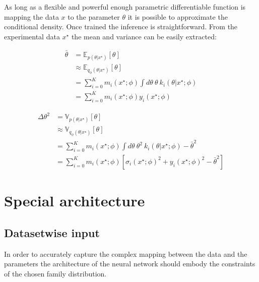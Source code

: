 As long as a flexible and powerful enough parametric differentiable function is mapping the data $x$ to the parameter $\theta$ it is possible to approximate the conditional density.
Once trained the inference is straightforward.
From the experimental data $x^\star$ the mean and variance can be easily extracted:

\begin{align}
    \bar \theta & = \mathbb E_{p(\theta | x^\star)}[\theta] \\
    & \approx \mathbb E_{q_\phi(\theta | x^\star)}[\theta] \\
    & = \sum_{i=0}^K m_i(x^\star ; \phi) \int d\theta ~ \theta ~ k_i(\theta | x^\star ; \phi) \\
    & = \sum_{i=0}^K m_i(x^\star ; \phi) y_i(x^\star ; \phi)
\end{align}

\begin{align}
    \Delta\theta^2 & = \mathbb V_{p(\theta | x^\star)}[\theta] \\
    & \approx \mathbb V_{q_\phi(\theta | x^\star)}[\theta] \\
    & = \sum_{i=0}^K m_i(x^\star ; \phi) \int d\theta ~ \theta^2 ~ k_i(\theta | x^\star ; \phi) - \bar \theta^2 \\
    & = \sum_{i=0}^K m_i(x^\star ; \phi) \left [ \sigma_i(x^\star ; \phi)^2 + y_i(x^\star ; \phi)^2 - \bar \theta^2 \right ]
\end{align}

\section{Special architecture} %
\label{sec:special_architecture}




\subsection{Datasetwise input} %
\label{sub:datasetwise_input}


In order to accurately capture the complex mapping between the data and the parameters the architecture of the neural network should embody the constraints of the chosen family distribution.

